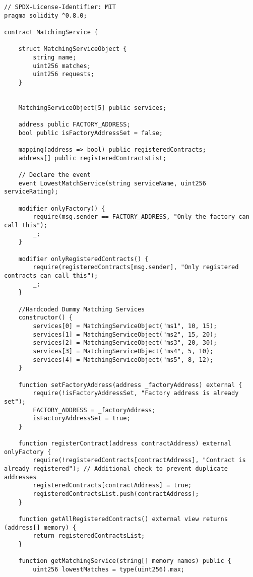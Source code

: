 \lstset{
  basicstyle=\footnotesize\ttfamily,
  breaklines=true,
  numbers=left,
  firstnumber=1,
}


\begin{lstlisting}
// SPDX-License-Identifier: MIT
pragma solidity ^0.8.0;

contract MatchingService {

    struct MatchingServiceObject {
        string name;
        uint256 matches;
        uint256 requests;
    }


    MatchingServiceObject[5] public services;

    address public FACTORY_ADDRESS;
    bool public isFactoryAddressSet = false;

    mapping(address => bool) public registeredContracts;
    address[] public registeredContractsList; 

    // Declare the event
    event LowestMatchService(string serviceName, uint256 serviceRating);

    modifier onlyFactory() {
        require(msg.sender == FACTORY_ADDRESS, "Only the factory can call this");
        _;
    }

    modifier onlyRegisteredContracts() {
        require(registeredContracts[msg.sender], "Only registered contracts can call this");
        _;
    }

    //Hardcoded Dummy Matching Services 
    constructor() {
        services[0] = MatchingServiceObject("ms1", 10, 15);
        services[1] = MatchingServiceObject("ms2", 15, 20);
        services[2] = MatchingServiceObject("ms3", 20, 30);
        services[3] = MatchingServiceObject("ms4", 5, 10);
        services[4] = MatchingServiceObject("ms5", 8, 12);
    }

    function setFactoryAddress(address _factoryAddress) external {
        require(!isFactoryAddressSet, "Factory address is already set");
        FACTORY_ADDRESS = _factoryAddress;
        isFactoryAddressSet = true;
    }

    function registerContract(address contractAddress) external onlyFactory {
        require(!registeredContracts[contractAddress], "Contract is already registered"); // Additional check to prevent duplicate addresses
        registeredContracts[contractAddress] = true;
        registeredContractsList.push(contractAddress); 
    }

    function getAllRegisteredContracts() external view returns (address[] memory) {
        return registeredContractsList;
    }

    function getMatchingService(string[] memory names) public {
        uint256 lowestMatches = type(uint256).max;


\end{lstlisting}
